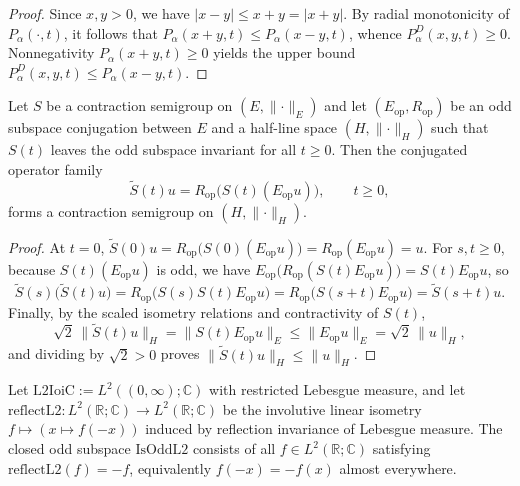 \begin{proof}
\leanok
Since $x, y > 0$, we have $\lvert x - y \rvert \le x + y = \lvert x + y \rvert$. By radial monotonicity of $P_\alpha(\cdot, t)$, it follows that $P_\alpha(x + y, t) \le P_\alpha(x - y, t)$, whence $P_\alpha^D(x, y, t) \ge 0$. Nonnegativity $P_\alpha(x + y, t) \ge 0$ yields the upper bound $P_\alpha^D(x, y, t) \le P_\alpha(x - y, t)$.
\end{proof}

\begin{theorem}\label{thm:reflected_contraction_semigroup}
\leanok
Let $S$ be a contraction semigroup on $(E, \lVert \cdot \rVert_E)$ and let $(E_{\mathrm{op}}, R_{\mathrm{op}})$ be an odd subspace conjugation between $E$ and a half-line space $(H, \lVert \cdot \rVert_H)$ such that $S(t)$ leaves the odd subspace invariant for all $t \ge 0$. Then the conjugated operator family
\[
  \widetilde{S}(t) u = R_{\mathrm{op}}\bigl(S(t)(E_{\mathrm{op}} u)\bigr), \qquad t \ge 0,
\]
forms a contraction semigroup on $(H, \lVert \cdot \rVert_H)$.
\end{theorem}

\begin{proof}
\leanok
At $t = 0$, $\widetilde{S}(0)u = R_{\mathrm{op}}\bigl(S(0)(E_{\mathrm{op}} u)\bigr) = R_{\mathrm{op}}(E_{\mathrm{op}} u) = u$. For $s, t \ge 0$, because $S(t)(E_{\mathrm{op}} u)$ is odd, we have $E_{\mathrm{op}}\bigl(R_{\mathrm{op}}(S(t) E_{\mathrm{op}} u)\bigr) = S(t) E_{\mathrm{op}} u$, so
\[
  \widetilde{S}(s)\bigl(\widetilde{S}(t) u\bigr) = R_{\mathrm{op}}\bigl(S(s) S(t) E_{\mathrm{op}} u\bigr) = R_{\mathrm{op}}\bigl(S(s + t) E_{\mathrm{op}} u\bigr) = \widetilde{S}(s + t) u.
\]
Finally, by the scaled isometry relations and contractivity of $S(t)$,
\[
  \sqrt{2}\, \lVert \widetilde{S}(t) u \rVert_H = \lVert S(t) E_{\mathrm{op}} u \rVert_E \le \lVert E_{\mathrm{op}} u \rVert_E = \sqrt{2}\, \lVert u \rVert_H,
\]
and dividing by $\sqrt{2} > 0$ proves $\lVert \widetilde{S}(t) u \rVert_H \le \lVert u \rVert_H$.
\end{proof}

\begin{definition}\label{def:half_line_l2_reflection}
\leanok
Let $\mathrm{L2IoiC} := L^2((0, \infty); \mathbb{C})$ with restricted Lebesgue measure, and let $\mathrm{reflectL2} : L^2(\mathbb{R}; \mathbb{C}) \to L^2(\mathbb{R}; \mathbb{C})$ be the involutive linear isometry $f \mapsto (x \mapsto f(-x))$ induced by reflection invariance of Lebesgue measure. The closed odd subspace $\mathrm{IsOddL2}$ consists of all $f \in L^2(\mathbb{R}; \mathbb{C})$ satisfying $\mathrm{reflectL2}(f) = -f$, equivalently $f(-x) = -f(x)$ almost everywhere.
\end{definition}

